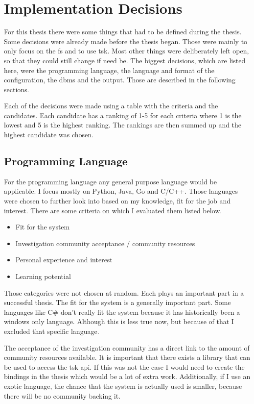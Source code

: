 \chapter{Implementation Decisions}
\label{sec:decisions}

For this thesis there were some things that had to be defined during the thesis. Some decisions were already made before the thesis began. Those were mainly to only focus on the \gls{fs} and to use \gls{tsk}. Most other things were deliberately left open, so that they could still change if need be. The biggest decisions, which are listed here, were the programming language, the language and format of the configuration, the \gls{dbms} and the output. Those are described in the following sections. 

Each of the decisions were made using a table with the criteria and the candidates. Each candidate has a ranking of 1-5 for each criteria where 1 is the lowest and 5 is the highest ranking. The rankings are then summed up and the highest candidate was chosen. 

\section{Programming Language}
\label{sec:decisions:language}

For the programming language any general purpose language would be applicable. I focus mostly on Python, Java, Go and C/C++. Those languages were chosen to further look into based on my knowledge, fit for the job and interest. There are some criteria on which I evaluated them listed below.

\begin{itemize}
    \item Fit for the system
    \item Investigation community acceptance / community resources
    \item Personal experience and interest
    \item Learning potential
\end{itemize}

Those categories were not chosen at random. Each plays an important part in a successful thesis. The fit for the system is a generally important part. Some languages like C\# don't really fit the system because it has historically been a windows only language. Although this is less true now, but because of that I excluded that specific language.

The acceptance of the investigation community has a direct link to the amount of community resources available. It is important that there exists a library that can be used to access the \gls{tsk} \gls{api}. If this was not the case I would need to create the bindings in the thesis which would be a lot of extra work. Additionally, if I use an exotic language, the chance that the system is actually used is smaller, because there will be no community backing it.

